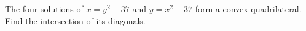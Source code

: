 The four solutions of $x=y^2-37$ and $y=x^2-37$ form a convex quadrilateral. Find the intersection of its diagonals.
